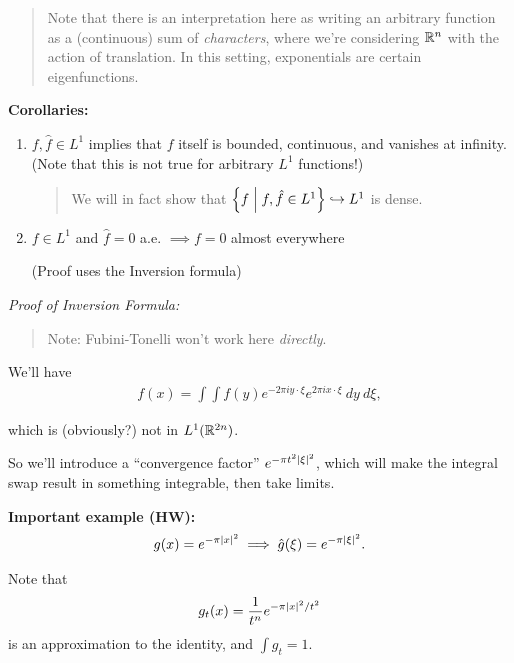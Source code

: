 \begin{quote}
Note that there is an interpretation here as writing an arbitrary
function as a (continuous) sum of \emph{characters}, where we're
considering \({\mathbb{R}}^n\) with the action of translation. In this setting,
exponentials are certain eigenfunctions.
\end{quote}

\textbf{Corollaries:}

\begin{enumerate}
\def\labelenumi{\arabic{enumi}.}
\item
  \(f, \hat{f} \in L^1\) implies that \(f\) itself is bounded,
  continuous, and vanishes at infinity. (Note that this is not true for
  arbitrary \(L^1\) functions!)

  \begin{quote}
  We will in fact show that
  \(\left\{{f \mathrel{\Big|} f, \hat{f} \in L^1}\right\}\hookrightarrow L^1\) is dense.
  \end{quote}
\item
  \(f \in L^1\) and \(\hat{f} = 0\) a.e. \(\implies f = 0\) almost
  everywhere

  (Proof uses the Inversion formula)
\end{enumerate}

\emph{Proof of Inversion Formula:}

\begin{quote}
Note: Fubini-Tonelli won't work here \emph{directly}.
\end{quote}

We'll have
\begin{align*}
f(x) = \int\int f(y) e^{-2\pi i y\cdot \xi} e^{2\pi i x \cdot \xi} ~dy ~d\xi,
\end{align*}

which is (obviously?) not in \(L^1({\mathbb{R}}^{2n})\).

So we'll introduce a ``convergence factor''
\(e^{-\pi t^2 {\left\lvert {\xi} \right\rvert}^2}\), which will make the integral swap result
in something integrable, then take limits.

\textbf{Important example (HW):}
\begin{align*}
g(x) = e^{-\pi {\left\lvert {x} \right\rvert}^2} \implies \hat{g}(\xi) = e^{-\pi {\left\lvert {\xi} \right\rvert}^2}
.\end{align*}

Note that
\begin{align*}
g_t(x) = \frac{1}{t^n} e^{-\pi {\left\lvert {x} \right\rvert}^2 / t^2}
\end{align*} is an approximation to the identity, and \(\int g_t = 1\).

